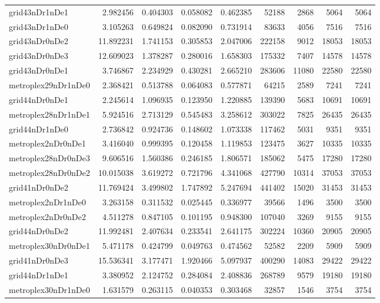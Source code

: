 \documentclass[../../../thesis.tex]{subfiles}
\begin{document}
\begin{longtable}{|l|r|r|r|r|r|r|r|r|}
grid43nDr1nDe1 & 2.982456 & 0.404303 & 0.058082 & 0.462385 & 52188 & 2868 & 5064 & 5064 \\
grid43nDr1nDe0 & 3.105263 & 0.649824 & 0.082090 & 0.731914 & 83633 & 4056 & 7516 & 7516 \\
grid43nDr0nDe2 & 11.892231 & 1.741153 & 0.305853 & 2.047006 & 222158 & 9012 & 18053 & 18053 \\
grid43nDr0nDe3 & 12.609023 & 1.378287 & 0.280016 & 1.658303 & 175332 & 7407 & 14578 & 14578 \\
grid43nDr0nDe1 & 3.746867 & 2.234929 & 0.430281 & 2.665210 & 283606 & 11080 & 22580 & 22580 \\
metroplex29nDr1nDe0 & 2.368421 & 0.513788 & 0.064083 & 0.577871 & 64215 & 2589 & 7241 & 7241 \\
grid44nDr0nDe1 & 2.245614 & 1.096935 & 0.123950 & 1.220885 & 139390 & 5683 & 10691 & 10691 \\
metroplex28nDr1nDe1 & 5.924516 & 2.713129 & 0.545483 & 3.258612 & 303022 & 7825 & 26435 & 26435 \\
grid44nDr1nDe0 & 2.736842 & 0.924736 & 0.148602 & 1.073338 & 117462 & 5031 & 9351 & 9351 \\
metroplex2nDr0nDe1 & 3.416040 & 0.999395 & 0.120458 & 1.119853 & 123475 & 3627 & 10335 & 10335 \\
metroplex28nDr0nDe3 & 9.606516 & 1.560386 & 0.246185 & 1.806571 & 185062 & 5475 & 17280 & 17280 \\
metroplex28nDr0nDe2 & 10.015038 & 3.619272 & 0.721796 & 4.341068 & 427790 & 10314 & 37053 & 37053 \\
grid41nDr0nDe2 & 11.769424 & 3.499802 & 1.747892 & 5.247694 & 441402 & 15020 & 31453 & 31453 \\
metroplex2nDr1nDe0 & 3.263158 & 0.311532 & 0.025445 & 0.336977 & 39566 & 1496 & 3500 & 3500 \\
metroplex2nDr0nDe2 & 4.511278 & 0.847105 & 0.101195 & 0.948300 & 107040 & 3269 & 9155 & 9155 \\
grid44nDr0nDe2 & 11.992481 & 2.407634 & 0.233541 & 2.641175 & 302224 & 10360 & 20905 & 20905 \\
metroplex30nDr0nDe1 & 5.471178 & 0.424799 & 0.049763 & 0.474562 & 52582 & 2209 & 5909 & 5909 \\
grid41nDr0nDe3 & 15.536341 & 3.177471 & 1.920466 & 5.097937 & 400290 & 14083 & 29422 & 29422 \\
grid44nDr1nDe1 & 3.380952 & 2.124752 & 0.284084 & 2.408836 & 268789 & 9579 & 19180 & 19180 \\
metroplex30nDr1nDe0 & 1.631579 & 0.263115 & 0.040353 & 0.303468 & 32857 & 1546 & 3754 & 3754 \\

\end{longtable}
\end{document}
